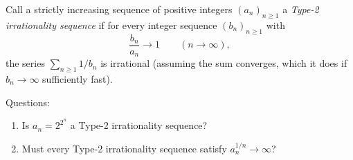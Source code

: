 Call a strictly increasing sequence of positive integers $(a_n)_{n\ge 1}$ a \emph{Type-2 irrationality sequence} if for every integer sequence $(b_n)_{n\ge 1}$ with
\[
\frac{b_n}{a_n}\to 1\qquad (n\to\infty),
\]
the series $\sum_{n\ge 1} 1/b_n$ is irrational (assuming the sum converges, which it does if $b_n\to\infty$ sufficiently fast).

Questions:
\begin{enumerate}[label=(\alph*),leftmargin=2em]
\item Is $a_n=2^{2^n}$ a Type-2 irrationality sequence?
\item Must every Type-2 irrationality sequence satisfy $a_n^{1/n}\to\infty$?
\end{enumerate}
